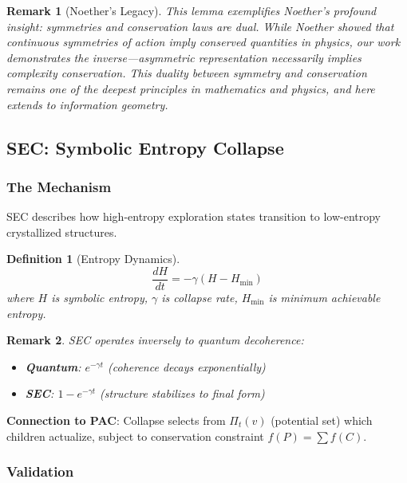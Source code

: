 \documentclass[11pt,a4paper]{article}
\newtheorem{definition}{Definition}
\newtheorem{remark}{Remark}
\begin{document}
\begin{remark}[Noether's Legacy]
This lemma exemplifies Noether's profound insight: \emph{symmetries and conservation laws are dual}. While Noether showed that continuous symmetries of action imply conserved quantities in physics, our work demonstrates the inverse---asymmetric representation necessarily implies complexity conservation. This duality between symmetry and conservation remains one of the deepest principles in mathematics and physics, and here extends to information geometry.
\end{remark}

\subsection{SEC: Symbolic Entropy Collapse}

\subsubsection{The Mechanism}

SEC describes how high-entropy exploration states transition to low-entropy crystallized structures.

\begin{definition}[Entropy Dynamics]
\begin{equation}
\frac{dH}{dt} = -\gamma(H - H_{\min})
\end{equation}
where $H$ is symbolic entropy, $\gamma$ is collapse rate, $H_{\min}$ is minimum achievable entropy.
\end{definition}

\begin{remark}
SEC operates \emph{inversely} to quantum decoherence:
\begin{itemize}
    \item \textbf{Quantum}: $e^{-\gamma t}$ (coherence decays exponentially)
    \item \textbf{SEC}: $1 - e^{-\gamma t}$ (structure stabilizes to final form)
\end{itemize}
\end{remark}

\textbf{Connection to PAC}: Collapse selects from $\Pi_t(v)$ (potential set) which children actualize, subject to conservation constraint $f(P) = \sum f(C)$.

\subsubsection{Validation}
\end{document}

